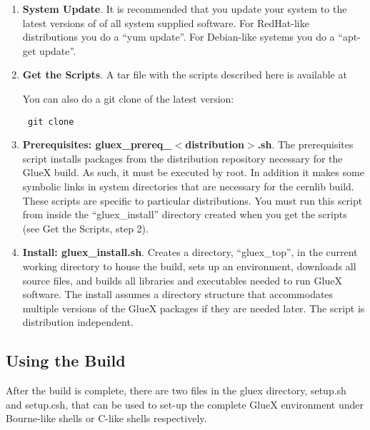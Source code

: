 \documentclass[12pt]{article}
\begin{document}
\begin{enumerate}

\item {\bf System Update}. It is recommended that you update your
  system to the latest versions of of all system supplied
  software. For RedHat-like distributions you do a ``yum update''. For
  Debian-like systems you do a ``apt-get update''.

\item {\bf Get the Scripts}. A tar file with the scripts described
  here is available at
  \begin{center}
  \end{center}
You can also do a git clone of the latest version:
\begin{center}\tt
  git clone 
\end{center}

\item {\bf Prerequisites: gluex\_prereq\_$<$distribution$>$.sh}. The
  prerequisites script installs packages from the distribution
  repository necessary for the GlueX build. As such, it must be
  executed by root. In addition it makes some symbolic links in system
  directories that are necessary for the cernlib build. These scripts
  are specific to particular distributions. You must run this
  script from inside the ``gluex\_install'' directory created when you
  get the scripts (see Get the Scripts, step 2).

\item {\bf Install: gluex\_install.sh}. Creates a directory,
  ``gluex\_top'', in the current working directory to house the build,
  sets up an environment, downloads all source files, and builds all
  libraries and executables needed to run GlueX software. The install
  assumes a directory structure that accommodates multiple versions of
  the GlueX packages if they are needed later. The script is
  distribution independent.

\end{enumerate}

\subsection{Using the Build}

After the build is complete, there are two files in the gluex
directory, setup.sh and setup.csh, that can be used to set-up the
complete GlueX environment under Bourne-like shells or C-like shells
respectively.
\end{document}
